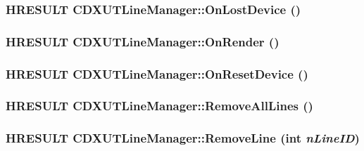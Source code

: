 \label{class_c_d_x_u_t_line_manager_a4ad6b10373fe6179783f3805379643c4}
\hypertarget{class_c_d_x_u_t_line_manager_a609fbd2215c2c4fbb02bf42d98686346}{
\subsubsection[{OnLostDevice}]{\setlength{\rightskip}{0pt plus 5cm}HRESULT CDXUTLineManager::OnLostDevice ()}}
\label{class_c_d_x_u_t_line_manager_a609fbd2215c2c4fbb02bf42d98686346}
\hypertarget{class_c_d_x_u_t_line_manager_a7bac9b5284fe576db806cba8423b2eda}{
\subsubsection[{OnRender}]{\setlength{\rightskip}{0pt plus 5cm}HRESULT CDXUTLineManager::OnRender ()}}
\label{class_c_d_x_u_t_line_manager_a7bac9b5284fe576db806cba8423b2eda}
\hypertarget{class_c_d_x_u_t_line_manager_af0a79d23ae9c18275b57c59c36828ca8}{
\subsubsection[{OnResetDevice}]{\setlength{\rightskip}{0pt plus 5cm}HRESULT CDXUTLineManager::OnResetDevice ()}}
\label{class_c_d_x_u_t_line_manager_af0a79d23ae9c18275b57c59c36828ca8}
\hypertarget{class_c_d_x_u_t_line_manager_ad07600de77c719bb97f1ee004387d241}{
\subsubsection[{RemoveAllLines}]{\setlength{\rightskip}{0pt plus 5cm}HRESULT CDXUTLineManager::RemoveAllLines ()}}
\label{class_c_d_x_u_t_line_manager_ad07600de77c719bb97f1ee004387d241}
\hypertarget{class_c_d_x_u_t_line_manager_aabb8acc5fc21c6a283575031fe49ed90}{
\subsubsection[{RemoveLine}]{\setlength{\rightskip}{0pt plus 5cm}HRESULT CDXUTLineManager::RemoveLine ({\bf int} {\em nLineID})}}
\label{class_c_d_x_u_t_line_manager_aabb8acc5fc21c6a283575031fe49ed90}


